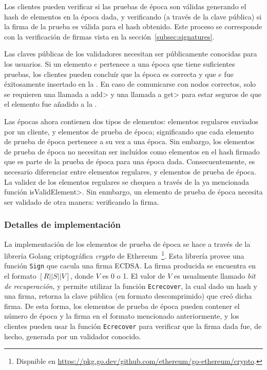 Los clientes pueden verificar si las pruebas de época son válidas generando el hash de elementos
en la época dada, y verificando (a través de la clave pública) si la firma de la prueba es válida
para el hash obtenido. Este proceso se corresponde con la verificación de firmas vista en la
sección~\ref{subsec:signatures}.

%
Las claves públicas de los validadores necesitan ser públicamente conocidas para los usuarios.
%
Si un elemento $e$ pertenece a una época que tiene suficientes pruebas, los clientes pueden
concluír que la época es correcta y que $e$ fue éxitosamente insertado en la \setchain.
%
En caso de comunicarse con nodos correctos, solo se requieren una llamada a \<add> y
una llamada a \<get> para estar seguros de que el elemento fue añadido a la \setchain.
%

Las épocas ahora contienen dos tipos de elementos: elementos regulares enviados por
un cliente, y elementos de prueba de época; significando que cada elemento de prueba de época
pertenece a su vez a una época. Sin embargo, los elementos de prueba de época no necesitan ser
incluídos como elementos en el hash firmado que es parte de la prueba de época para una época
dada.
%
Consecuentemente, es necesario diferenciar entre elementos regulares, y elementos de prueba de época.
%
La validez de los elementos regulares se chequea a través de la ya mencionada función
\<isValidElement>.
%
Sin enmbargo, un elemento de prueba de época necesita ser validado de otra manera: verificando la firma.
%

\subsubsection{Detalles de implementación}

La implementación de los elementos de prueba de época se hace a través de la librería
Golang criptográfica \textit{crypto} de Ethereum~\footnote{Dispnible en \url{https://pkg.go.dev/github.com/ethereum/go-ethereum/crypto}.}.
%
Esta librería provee una función \texttt{Sign} que cacula una firma ECDSA.
%
La firma producida se encuentra en el formato $[R || S || V]$, donde $V$ es 0 o 1.
%
El valor de $V$ es usualmente llamado \textit{bit de recuperación}, y permite utilizar
la función \texttt{Ecrecover}, la cual dado un hash y una firma, retorna la clave pública
(en formato descomprimido) que creó dicha firma.
%
De esta forma, los elementos de prueba de época pueden contener el número de época y la firma
en el formato mencionado anteriormente, y los clientes pueden usar la función \texttt{Ecrecover} para
verificar que la firma dada fue, de hecho, generada por un validador conocido.
%

